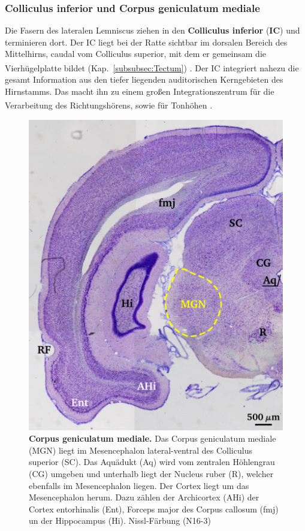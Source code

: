\documentclass[12pt,a4paper,pdftex]{article}
\begin{document}
\newpage
\subsubsection*{Colliculus inferior und Corpus geniculatum mediale}

Die Fasern des lateralen Lemniscus ziehen in den \textbf{Colliculus inferior} (\textbf{IC})  und terminieren dort. Der IC liegt bei der Ratte sichtbar im dorsalen Bereich des Mittelhirns, caudal vom Colliculus superior, mit dem er gemeinsam die Vierhügelplatte bildet (Kap.~\ref{subsubsec:Tectum}) \textsuperscript{\cite[29]{paxinos2014rat}}. 
Der IC integriert nahezu die gesamt Information aus den tiefer liegenden auditorischen Kerngebieten des Hirnstamms. Das macht ihn zu einem großen Integrationszentrum für die Verarbeitung des Richtungshörens, sowie für Tonhöhen \textsuperscript{\cite[29]{paxinos2014rat}}.

\begin{figure}[H]
    \centering
    \includegraphics{pictures/auditory/MG.png}
    \caption[Corpus geniculatum mediale]{\textbf{Corpus geniculatum mediale.} Das Corpus geniculatum mediale (MGN) liegt im Mesencephalon lateral-ventral des Colliculus superior (SC). Das Aquädukt (Aq) wird vom zentralen Höhlengrau (CG) umgeben und unterhalb liegt der Nucleus ruber (R), welcher ebenfalls im Mesencephalon liegen. Der Cortex liegt um das Mesencephalon herum. Dazu zählen der Archicortex (AHi) der Cortex entorhinalis (Ent), Forceps major des Corpus callosum (fmj) un der Hippocampus (Hi). Nissl-Färbung (N16-3)}
    \label{fig:MG}
\end{figure}
\end{document}
